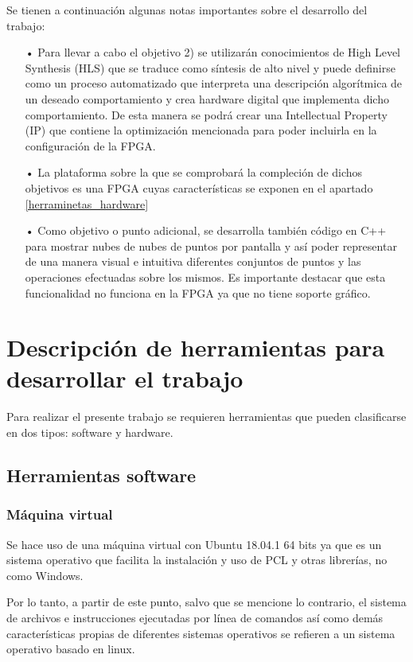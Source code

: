 Se tienen a continuación algunas notas importantes sobre el desarrollo del trabajo:
\begin{itemize}
\item[•] Para llevar a cabo el objetivo 2) se utilizarán conocimientos de High Level Synthesis (HLS) que se traduce como síntesis de alto nivel y puede definirse como un proceso automatizado que interpreta una descripción algorítmica de un deseado comportamiento y crea hardware digital que implementa dicho comportamiento. De esta manera se podrá crear una Intellectual Property (IP) que contiene la optimización mencionada para poder incluirla en la configuración de la FPGA.
\item[•] La plataforma sobre la que se comprobará la compleción de dichos objetivos es una FPGA cuyas características se exponen en el apartado \ref{herraminetas_hardware}
\item[•] Como objetivo o punto adicional, se desarrolla también código en C++ para mostrar nubes de nubes de puntos por pantalla y así poder representar de una manera visual e intuitiva diferentes conjuntos de puntos y las operaciones efectuadas sobre los mismos. Es importante destacar que esta funcionalidad no funciona en la FPGA ya que no tiene soporte gráfico.

\end{itemize}

 

\section{Descripción de herramientas para desarrollar el trabajo}
Para realizar el presente trabajo se requieren herramientas que pueden clasificarse en dos tipos: software y hardware.




\subsection{Herramientas software}
\subsubsection{Máquina virtual}
Se hace uso de una máquina virtual con Ubuntu 18.04.1 64 bits ya que es un sistema operativo que facilita la instalación y uso de PCL y otras librerías, no como Windows. 

Por lo tanto, a partir de este punto, salvo que se mencione lo contrario, el sistema de archivos e instrucciones ejecutadas por línea de comandos así como demás características propias de diferentes sistemas operativos se refieren a un sistema operativo basado en linux.

